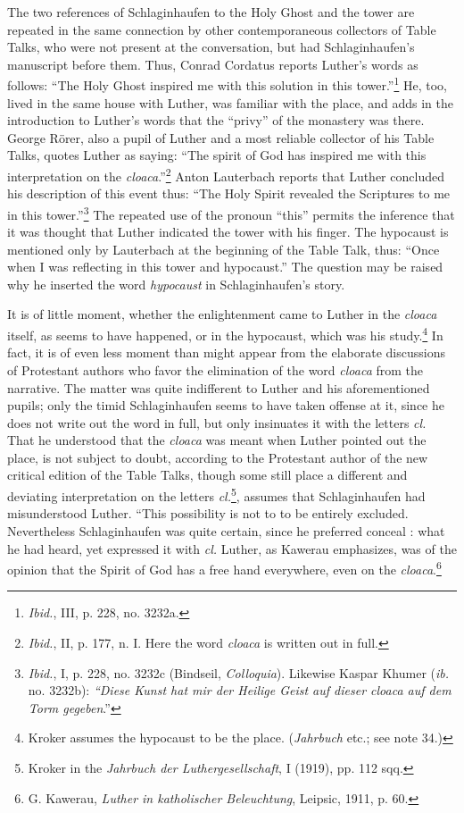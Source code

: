 The two references of Schlaginhaufen to the Holy Ghost and the
tower are repeated in the same connection by other contemporaneous
collectors of Table Talks, who were not present at the conversation,
but had Schlaginhaufen’s manuscript before them. Thus, Conrad
Cordatus reports Luther’s words as follows: “The Holy Ghost inspired
me with this solution in this tower.”\footnote{\textit{Ibid.}, III, p. 228, no. 3232a.}
He, too, lived in the same house
with Luther, was familiar with the place, and adds in the introduction
to Luther’s words that the “privy” of the monastery was there. George
Rörer, also a pupil of Luther and a most reliable collector of his Table
Talks, quotes Luther as saying: “The spirit of God has inspired me
with this interpretation on the \textit{cloaca}.”\footnote
{\textit{Ibid.}, II, p. 177, n. I. Here the word \textit{cloaca} is written out in full.}
Anton Lauterbach reports
that Luther concluded his description of this event thus: “The Holy
Spirit revealed the Scriptures to me in this tower.”\footnote
{\textit{Ibid.}, I, p. 228, no. 3232c (Bindseil, \textit{Colloquia}). Likewise Kaspar Khumer (\textit{ib.} no.
3232b): \textit{“Diese Kunst hat mir der Heilige Geist auf dieser cloaca auf dem Torm gegeben}.”}
The repeated
use of the pronoun “this” permits the inference that it was thought
that Luther indicated the tower with his finger. The hypocaust is
mentioned only by Lauterbach at the beginning of the Table Talk,
thus: “Once when I was reflecting in this tower and hypocaust.” The
question may be raised why he inserted the word \textit{hypocaust} in
Schlaginhaufen’s story.

It is of little moment, whether the enlightenment came to Luther
in the \textit{cloaca} itself, as seems to have happened, or in the hypocaust,
which was his study.\footnote{Kroker assumes the hypocaust to be the place. (\textit{Jahrbuch} etc.; see note 34.)}
In fact, it is of even less moment than might
appear from the elaborate discussions of Protestant authors who
favor the elimination of the word \textit{cloaca} from the narrative. The
matter was quite indifferent to Luther and his aforementioned pupils; only
the timid Schlaginhaufen seems to have taken offense at it,
since he does not write out the word in full, but only insinuates it with
the letters \textit{cl.} That he understood that the \textit{cloaca} was meant when
Luther pointed out the place, is not subject to doubt, according to the
Protestant author of the new critical edition of the Table Talks,
though some still place a different and deviating interpretation on
the letters \textit{cl.}\footnote{Kroker in the \textit{Jahrbuch der Luthergesellschaft}, I (1919), pp. 112 sqq.}, assumes that
Schlaginhaufen had misunderstood Luther. “This possibility is not to to be entirely excluded.
Nevertheless Schlaginhaufen was quite certain, since he preferred conceal : what he had
heard, yet expressed it with \textit{cl.}
Luther, as Kawerau emphasizes, was of the opinion
that the Spirit of God has a free hand everywhere, even on the
\textit{cloaca}.\footnote{G. Kawerau, \textit{Luther in katholischer Beleuchtung}, Leipsic, 1911, p. 60.}

